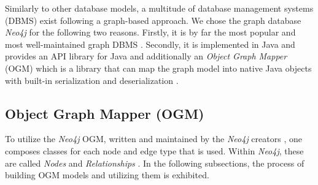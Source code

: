 \documentclass[12pt,a4paper]{report}
\begin{document}
Similarly to other database models, a multitude of database management
systems (DBMS) exist following a graph-based approach.
We chose the graph database \textit{Neo4j} for the following two reasons.
Firstly, it is by far the most popular and most well-maintained graph DBMS
\cite{graph-dbms-ranking}.
Secondly, it is implemented in Java and provides an API library for Java
and additionally an \textit{Object Graph Mapper} (OGM) which is a library
that can map the graph model into native Java objects with built-in
serialization and deserialization \cite{neo4j-ogm}.


\subsection{Object Graph Mapper (OGM)}

To utilize the \textit{Neo4j} OGM, written and maintained by the \textit{Neo4j}
creators \cite{neo4j-ogm}, one composes classes for each node and edge type
that is used. Within \textit{Neo4j}, these are called \textit{Nodes} and
\textit{Relationships} \cite{neo4j-ogm}.
In the following subsections, the process of building OGM models and utilizing
them is exhibited.
\end{document}

